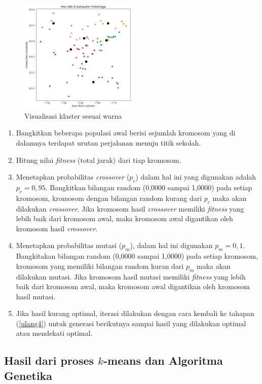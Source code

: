 \begin{figure}[h!]
	\centering
	\includegraphics[width=0.5\textwidth]{hasil klaster.png}
	\caption{Visualisasi klaster sesuai warna}
	\label{fig:hasilklas}
\end{figure}

\begin{enumerate}
	\item Bangkitkan beberapa populasi awal berisi sejumlah kromosom yang di dalamnya terdapat urutan perjalanan menuju titik sekolah.
	\item \label{ulang4} Hitung nilai \textit{fitness} (total jarak) dari tiap kromosom.
	\item Menetapkan probabilitas \textit{crossover} ($p_c$) dalam hal ini yang digunakan adalah $p_c=0,95$. Bangkitkan bilangan random (0,0000 sampai 1,0000) pada setiap kromosom, kromosom dengan bilangan random kurang dari $p_c$ maka akan dilakukan \textit{crossover}. Jika kromosom hasil \textit{crossover} memiliki \textit{fitness} yang lebih baik  dari kromosom awal, maka kromosom awal digantikan oleh kromosom hasil \textit{crossover}.
	\item Menetapkan probabilitas mutasi ($p_m$), dalam hal ini digunakan $p_m=0,1$. Bangkitakan bilangan random (0,0000 sampai 1,0000) pada setiap kromosom, kromosom yang memiliki bilangan random kuran dari $p_m$ maka akan dilakukan mutasi. Jika kromosom hasil mutasi memiliki \textit{fitness} yang lebih baik dari kromosom awal, maka kromosom awal digantikan oleh kromosom hasil mutasi.
	\item Jika hasil kurang optimal, iterasi dilakukan dengan cara kembali ke tahapan (\ref{ulang4}) untuk generasi berikutnya sampai hasil yang dilakukan optimal atau mendekati optimal.
\end{enumerate}

\subsection{Hasil dari proses \textbf{$k$}-means dan Algoritma Genetika}


